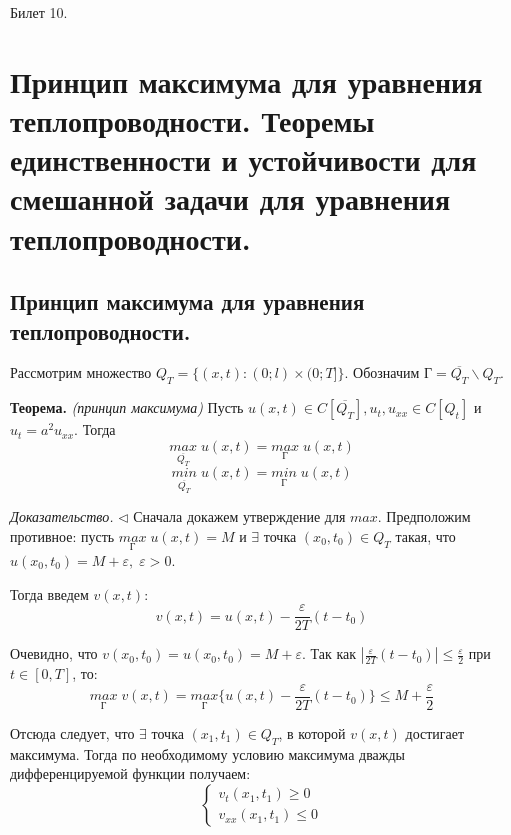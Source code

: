 \documentclass[11pt,a4paper]{article}
\begin{document}
    \LARGE Билет 10. \normalsize
    \section{Принцип максимума для уравнения теплопроводности. Теоремы единственности и устойчивости для смешанной задачи для уравнения теплопроводности.}
    \subsection{Принцип максимума для уравнения теплопроводности.}
    
    Рассмотрим множество $Q_T = \{(x, t) : (0; l) × (0; T]\}$. Обозначим $Г = \overline{Q_T} \backslash Q_T$.
    \par
    \textbf{Теорема.} \textit{(принцип максимума)} Пусть $u(x,t) \in C[\overline{Q_T}], u_t, u_{xx} \in C[Q_t]$ и $u_t = a^2u_{xx}$. Тогда
    $$
    \underset{\overline{Q_T}}{max} \; u(x,t) = \underset{Г}{max} \; u(x,t)
    $$
    $$
    \underset{\overline{Q_T}}{min} \; u(x,t) = \underset{Г}{min} \; u(x,t)
    $$
    
    \textit{Доказательство.} $\triangleleft$ Сначала докажем утверждение для $max$. Предположим противное: пусть $\underset{Г}{max} \; u(x,t) = M$ и $\exists$ точка $(x_0,t_0) \in Q_T$ такая, что $u(x_0,t_0)= M + \varepsilon, \; \varepsilon > 0$.
    \par
    Тогда введем $v(x,t)$:
    \begin{equation}
        \label{eq1}
        v(x,t) = u(x,t) - \frac{\varepsilon}{2T}(t - t_0)
    \end{equation}
    
    Очевидно, что $v(x_0,t_0) = u(x_0,t_0) = M + \varepsilon$. Так как $|\frac{\varepsilon}{2T}(t - t_0)| \leqslant \frac{\varepsilon}{2}$ при $t \in [0,T]$, то:
    $$
    \underset{Г}{max} \; v(x,t) = \underset{Г}{max} \{u(x,t) - \frac{\varepsilon}{2T}(t - t_0)\} \leqslant M + \frac{\varepsilon}{2}
    $$
    
    Отсюда следует, что $\exists$ точка $(x_1,t_1) \in Q_T$, в которой $v(x,t)$ достигает максимума. Тогда по необходимому условию максимума дважды дифференцируемой функции получаем:
    \begin{equation}
        \label{eq2}
        \begin{cases}
        v_t(x_1,t_1) \geqslant 0 \\
        v_{xx}(x_1,t_1) \leqslant 0
        \end{cases}
    \end{equation}
    
\end{document}
